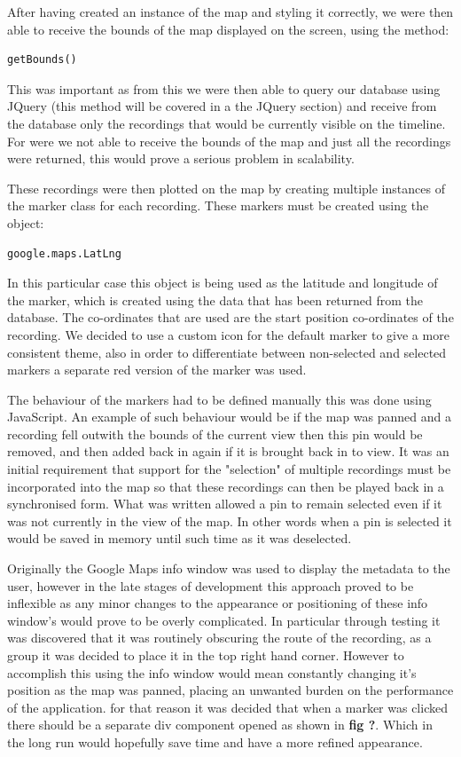 \documentclass{l3proj}
\begin{document}
After having created an instance of the map and styling it correctly, we were then able to receive the bounds of the map displayed on the screen, using the method:
\begin{verbatim}
getBounds()
\end{verbatim}
This was important as from this we were then able to query our database using JQuery (this method will be covered in a the JQuery section) and receive from the database only the recordings that would be currently visible on the timeline. For were we not able to receive the bounds of the map and just all the recordings were returned, this would prove a serious problem in scalability.

These recordings were then plotted on the map by creating multiple instances of the marker class for each recording. These markers must be created using the object:
\begin{verbatim}
google.maps.LatLng
\end{verbatim}
In this particular case this object is being used as the latitude and longitude of the marker, which is created using the data that has been returned from the database. The co-ordinates that are used are the start position co-ordinates of the recording. We decided to use a custom icon for the default marker to give a more consistent theme, also in order to differentiate between non-selected and selected markers a separate red version of the marker was used.

The behaviour of the markers had to be defined manually this was done using JavaScript. An example of such behaviour would be if the map was panned and a recording fell outwith the bounds of the current view then this pin would be removed, and then added back in again if it is brought back in to view. It was an initial requirement that support for the "selection" of multiple recordings must be incorporated into the map so that these recordings can then be played back in a synchronised form. What was written allowed a pin to remain selected even if it was not currently in the view of the map. In other words when a pin is selected it would be saved in memory until such time as it was deselected.

Originally the Google Maps info window was used to display the metadata to the user, however in the late stages of development this approach proved to be inflexible as any minor changes to the appearance or positioning of these info window’s would prove to be overly complicated. In particular through testing it was discovered that it was routinely obscuring the route of the recording, as a group it was decided to place it in the top right hand corner. However to accomplish this using the info window would mean constantly changing it's position as the map was panned, placing an unwanted burden on the performance of the application. for that reason it was decided that when a marker was clicked there should be a separate div component opened as shown in \textbf{fig ?}. Which in the long run would hopefully save time and have a more refined appearance.
\end{document}
